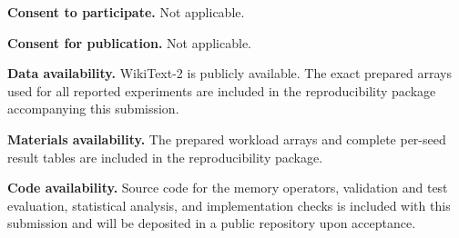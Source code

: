 \documentclass[11pt,a4paper]{article}
\begin{document}
\textbf{Consent to participate.} Not applicable.

\textbf{Consent for publication.} Not applicable.

\textbf{Data availability.} WikiText-2 is publicly available. The exact prepared arrays used for all reported experiments are included in the reproducibility package accompanying this submission.

\textbf{Materials availability.} The prepared workload arrays and complete per-seed result tables are included in the reproducibility package.

\textbf{Code availability.} Source code for the memory operators, validation and test evaluation, statistical analysis, and implementation checks is included with this submission and will be deposited in a public repository upon acceptance.
\end{document}

